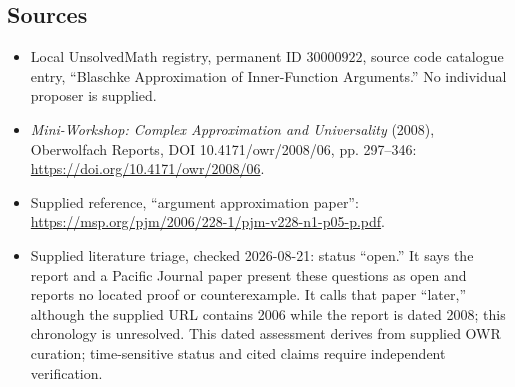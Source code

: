 \documentclass[11pt]{article}
\begin{document}
\subsection{Sources}
\begin{itemize}
\item Local UnsolvedMath registry, permanent ID \(30000922\), source code catalogue entry, ``Blaschke Approximation of Inner-Function Arguments.'' No individual proposer is supplied.
\item \emph{Mini-Workshop: Complex Approximation and Universality} (2008), Oberwolfach Reports, DOI 10.4171/owr/2008/06, pp. 297--346: \url{https://doi.org/10.4171/owr/2008/06}.
\item Supplied reference, ``argument approximation paper'': \url{https://msp.org/pjm/2006/228-1/pjm-v228-n1-p05-p.pdf}.
\item Supplied literature triage, checked 2026-08-21: status ``open.'' It says the report and a Pacific Journal paper present these questions as open and reports no located proof or counterexample. It calls that paper ``later,'' although the supplied URL contains 2006 while the report is dated 2008; this chronology is unresolved. This dated assessment derives from supplied OWR curation; time-sensitive status and cited claims require independent verification.
\end{itemize}
\end{document}
